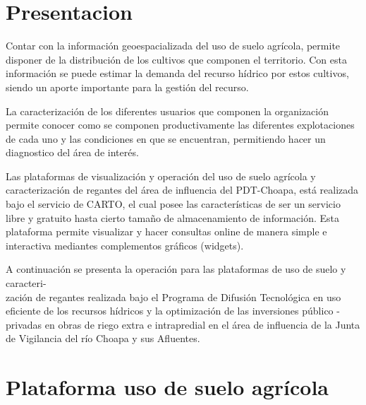 \documentclass[10pt]{article}
\begin{document}
\newpage
\tableofcontents

\newpage

\section{Presentacion}



Contar con la información geoespacializada del uso de suelo agrícola, permite disponer de la distribución de los cultivos que componen el territorio. Con esta información se puede estimar la demanda del recurso hídrico por estos cultivos, siendo un aporte importante para la gestión del recurso.\bigskip\setlength{\parindent}{0pt}

La caracterización de los diferentes usuarios que componen la organización permite conocer como se componen productivamente las diferentes explotaciones de cada uno y las condiciones en que se encuentran, permitiendo hacer un diagnostico del área de interés.\bigskip\setlength{\parindent}{0pt}

Las plataformas de visualización y operación del uso de suelo agrícola y caracterización de regantes del área de influencia del PDT-Choapa, está realizada bajo el servicio de CARTO, el cual posee las características de ser un servicio libre y gratuito hasta cierto tamaño de almacenamiento de información. Esta plataforma permite visualizar y hacer consultas online de manera simple e interactiva mediantes complementos gráficos (widgets).  \bigskip\setlength{\parindent}{0pt}

A continuación se presenta la operación para las plataformas de uso de suelo y caracteri-\\zación de regantes realizada bajo el Programa de Difusión Tecnológica en uso eficiente de los recursos hídricos y la optimización de las inversiones público - privadas en obras de riego extra e intrapredial en el área de influencia de la Junta de Vigilancia del río Choapa y  sus Afluentes.
\newpage

\section{Plataforma uso de suelo agrícola}
\end{document}
